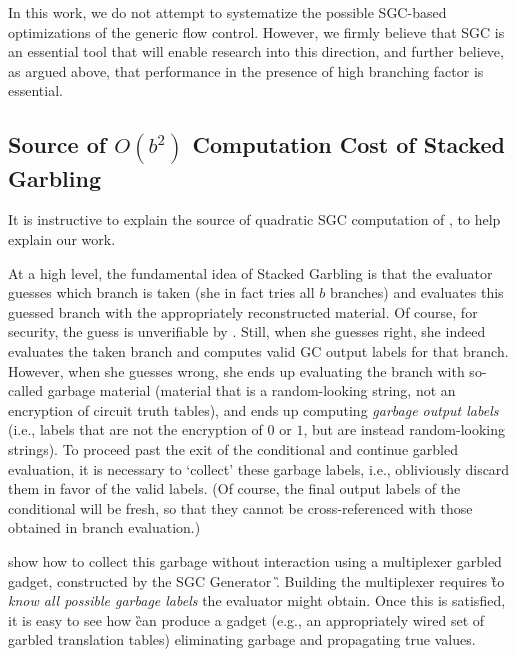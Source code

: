 In this work, we do not attempt to systematize the possible SGC-based
optimizations of the generic flow control.
However, we firmly believe that SGC is an essential tool that will
enable research into this direction, and further believe, as argued
above, that performance in the presence of high branching factor is
essential.





 




\subsection{Source of $O(b^2)$ Computation Cost of \HK Stacked Garbling }
\label{sec:bsquaredcost}

It is instructive to explain the source of quadratic SGC computation of \HK, to help explain our work.

At a high level, the fundamental idea of Stacked Garbling is that the evaluator \E
guesses which branch is taken (she in fact tries  all $b$
branches) and evaluates this guessed branch with the appropriately reconstructed material.  Of course, for security, the guess is unverifiable by \E. 
Still, when she guesses right, she indeed evaluates the taken branch and
computes valid GC output labels for that branch.
However, when she guesses wrong, she ends up evaluating the branch
with so-called garbage material (material that is a random-looking string, not
an encryption of circuit truth tables), and ends up computing
\emph{garbage output labels} (i.e., labels that are not the encryption
of $0$ or $1$, but are instead random-looking strings).
%
To proceed past the exit of the conditional and continue garbled evaluation, it is necessary to
`collect'  these garbage labels, i.e., obliviously  discard them in favor of the valid
labels.  (Of course, the final output labels of the conditional will be fresh,  so that they cannot be cross-referenced with those obtained in branch evaluation.)


\HK show how to collect this garbage without
interaction using a 
multiplexer garbled gadget, constructed by the SGC Generator \G.  
Building the \HK multiplexer requires \G to {\em know all possible
garbage labels} the evaluator might obtain.  Once this is satisfied, it is easy to see how \G can produce a gadget (e.g., an appropriately wired set of garbled translation tables) eliminating garbage and propagating true values.


